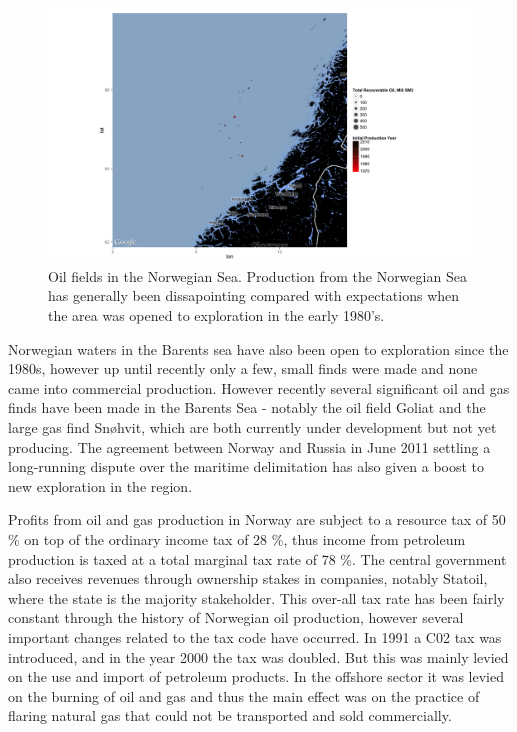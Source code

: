 \documentclass[12pt]{article}
\begin{document}
\begin{figure}
\includegraphics[width=1.2\textwidth]{figures/norwegian_sea_reserves_print.png}
\caption{Oil fields in the Norwegian Sea.  Production from the Norwegian Sea has generally been dissapointing compared with expectations when the area was opened to exploration in the early 1980's.}
\label{norwegian_sea_reserves}
\end{figure}

Norwegian waters in the Barents sea have also been open to exploration since the 1980s, however up until recently only a few, small finds were made and none came into commercial production.  However recently several significant oil and gas finds have been made in the Barents Sea - notably the oil field Goliat and the large gas find Sn\o hvit, which are both currently under development but not yet producing.  The agreement between Norway and Russia in June 2011 settling a long-running dispute over the maritime delimitation has also given a boost to new exploration in the region.  

Profits from oil and gas production in Norway are subject to a resource tax of 50 \% on top of the ordinary income tax of 28 \%, thus income from petroleum production is taxed at a total marginal tax rate of 78 \%.  The central government also receives revenues through ownership stakes in companies, notably Statoil, where the state is the majority stakeholder.  This over-all tax rate has been fairly constant through the history of Norwegian oil production, however several important changes related to the tax code have occurred.  In 1991 a C02 tax was introduced, and in the year 2000 the tax was doubled.  But this was mainly levied on the use and import of petroleum products.  In the offshore sector it was levied on the burning of oil and gas and thus the main effect was on the practice of flaring natural gas that could not be transported and sold commercially.   
\end{document}
